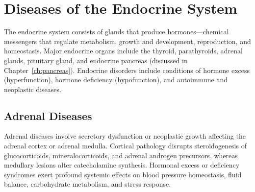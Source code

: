 \chapter{Diseases of the Endocrine System}
\label{ch:endocrine}
The endocrine system consists of glands that produce hormones---chemical messengers that regulate metabolism, growth and development, reproduction, and homeostasis. Major endocrine organs include the thyroid, parathyroids, adrenal glands, pituitary gland, and endocrine pancreas (discussed in Chapter~\ref{ch:pancreas}). Endocrine disorders include conditions of hormone excess (hyperfunction), hormone deficiency (hypofunction), and autoimmune and neoplastic diseases.

\section{Adrenal Diseases}




Adrenal diseases involve secretory dysfunction or neoplastic growth affecting the adrenal cortex or adrenal medulla. Cortical pathology disrupts steroidogenesis of glucocorticoids, mineralocorticoids, and adrenal androgen precursors, whereas medullary lesions alter catecholamine synthesis. Hormonal excess or deficiency syndromes exert profound systemic effects on blood pressure homeostasis, fluid balance, carbohydrate metabolism, and stress response.





\label{sec:Adrenal Diseases}

